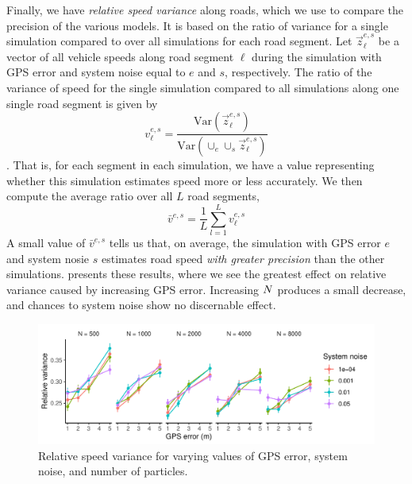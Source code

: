 Finally, we have \emph{relative speed variance} along roads, which we use to compare the precision of the various models. It is based on the ratio of variance for a single simulation compared to over all simulations for each road segment. Let $\vec z_\ell^{e,s}$ be a vector of all vehicle speeds along road segment $\ell$ during the simulation with GPS error and system noise equal to $e$ and $s$, respectively. The ratio of the variance of speed for the single simulation compared to all simulations along one single road segment is given by
\begin{equation}
\label{eq:rel_speed_var_ratio}
v_\ell^{e,s} =
\frac{
    \mathrm{Var}(\vec z_\ell^{e,s})
}{
    \mathrm{Var}(\cup_e\cup_s \vec z_\ell^{e,s})
}
\end{equation}.
That is, for each segment in each simulation, we have a value representing whether this simulation estimates speed more or less accurately. We then compute the average ratio over all $L$ road segments,
\begin{equation}
\label{eq:rel_speed_var}
\bar v^{e,s} = \frac{1}{L} \sum_{l=1}^L v_\ell^{e,s}
\end{equation}
A small value of $\bar v^{e,s}$ tells us that, on average, the simulation with GPS error $e$ and system nosie $s$ estimates road speed \emph{with greater precision} than the other simulations.  presents these results, where we see the greatest effect on relative variance caused by increasing GPS error. Increasing $N$ produces a small decrease, and chances to system noise show no discernable effect.


\begin{knitrout}\small
{}\color{fgcolor}\begin{figure}

{\centering \includegraphics[width=\textwidth]{figure/model_performance_var-1} 

}

\caption[Relative speed variance for varying values of GPS error, system noise, and number of particles]{Relative speed variance for varying values of GPS error, system noise, and number of particles.}\label{fig:model_performance_var}
\end{figure}


\end{knitrout}


